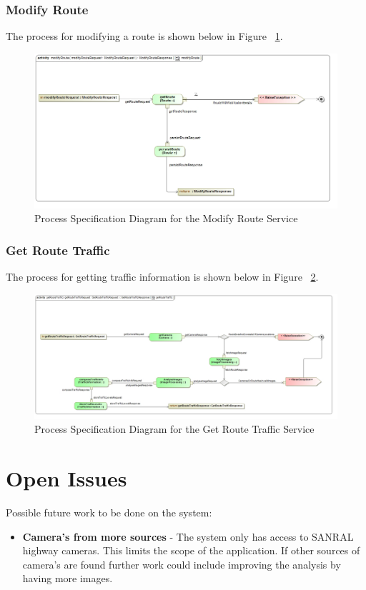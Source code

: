 \documentclass[a4paper,12pt]{article}
\begin{document}
\subsubsection{Modify Route}
The process for modifying a route is shown below in Figure ~\ref{fig:ps_modify}.
\begin{figure}[ht]
\includegraphics[width=\textwidth]{images/psModify_Route.jpg} 
\caption{Process Specification Diagram for the Modify Route Service}
\label{fig:ps_modify}
\end{figure}
\subsubsection{Get Route Traffic}
The process for getting traffic information is shown below in Figure ~\ref{fig:ps_gettraffic}.
\begin{figure}[ht]
\includegraphics[width=\textwidth]{images/ps_GetRouteTraffic.jpg}
\caption{Process Specification Diagram for the Get Route Traffic Service}
\label{fig:ps_gettraffic}
\end{figure}

\section{Open Issues}
Possible future work to be done on the system:
\begin{itemize}
\item \textbf{Camera's from more sources} - The system only has access to SANRAL highway cameras. This limits the scope of the application. If other sources of camera's are found further work could include improving the analysis by having more images.
\end{itemize}
\end{document}
